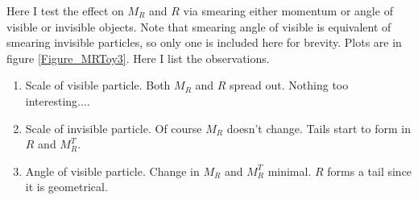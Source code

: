 \documentclass{fheadnote}
\begin{document}
Here I test the effect on $M_R$ and $R$ via smearing either momentum or angle of visible or invisible objects.
Note that smearing angle of visible is equivalent of smearing invisible particles, so only one is included here for brevity.
Plots are in figure \ref{Figure_MRToy3}.  Here I list the observations.
\begin{enumerate}
\item Scale of visible particle.  Both $M_R$ and $R$ spread out.  Nothing too interesting....
\item Scale of invisible particle.  Of course $M_R$ doesn't change.  Tails start to form in $R$ and $M^{T}_R$.
\item Angle of visible particle.  Change in $M_R$ and $M_R^T$ minimal.  $R$ forms a tail since it is geometrical.
\end{enumerate}
\end{document}
